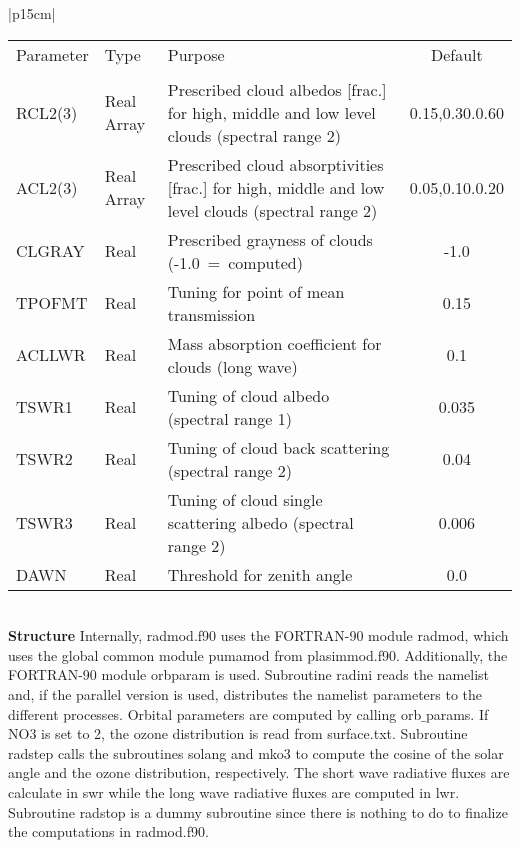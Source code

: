 \begin{center}
\begin{tabular}{|p{15cm}|}
\hline
\begin{center}
\begin{tabular}{l l p{5cm} c} %
Parameter & Type & Purpose & Default \\
&&&\\
RCL2(3) & Real Array & Prescribed cloud albedos [frac.] for high, middle and low level
clouds
(spectral range 2) &0.15,0.30.0.60 \\
ACL2(3) & Real Array & Prescribed cloud absorptivities [frac.] for high, middle and low
level
clouds (spectral range 2) &0.05,0.10.0.20 \\
CLGRAY & Real & Prescribed grayness of clouds (-1.0~=~computed) & -1.0 \\
TPOFMT& Real & Tuning for point of mean transmission & 0.15 \\
ACLLWR& Real & Mass absorption coefficient for clouds (long wave) & 0.1 \\
TSWR1 & Real & Tuning of cloud albedo (spectral range 1) & 0.035 \\
TSWR2 & Real & Tuning of cloud back scattering (spectral range 2) & 0.04 \\
TSWR3 & Real & Tuning of cloud single scattering albedo (spectral range 2) & 0.006 \\
DAWN  & Real & Threshold for zenith angle & 0.0 \\
\end{tabular} 
\end{center}
\vspace{3mm} \\
\hline
\vspace{2mm} {\bf Structure} Internally, {\module radmod.f90}
uses the FORTRAN-90 module {\modu radmod}, which uses the global
common module {\modu pumamod} from {\module plasimmod.f90}.
Additionally,  the  FORTRAN-90 module {\modu orbparam} is used.
Subroutine {\sub radini} reads the namelist and, if the
parallel version is used,  distributes the namelist parameters to
the different processes. 
Orbital parameters are computed by calling {\sub orb$\_$params}.
If NO3 is set to 2, the ozone distribution is read from
{\file surface.txt}. Subroutine {\sub radstep} calls the subroutines
{\sub solang} and {\sub mko3} to compute the cosine of the solar angle
and the ozone distribution, respectively.
The short wave radiative fluxes are calculate in {\sub swr} while
the long wave radiative fluxes are computed in {\sub lwr}.
Subroutine {\sub radstop} is a dummy subroutine since there is
nothing to do to finalize the computations in {\module radmod.f90}.
\vspace{3mm} \\
\hline
\end{tabular}
\end{center}
\newpage


